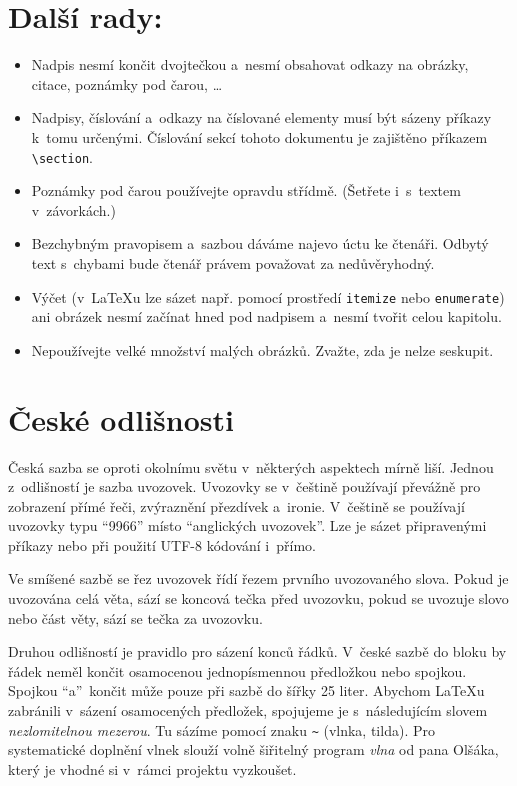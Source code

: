 \documentclass[twocolumn]{article}[23.02.2024]
\begin{document}
\section{Další rady:}
\label{sec:dalsi_rady}
\begin{itemize}
    \item Nadpis nesmí končit dvojtečkou a~nesmí obsahovat odkazy na obrázky, citace, poznámky pod čarou, \ldots
    \item Nadpisy, číslování a~odkazy na číslované elementy musí být sázeny příkazy k~tomu určenými. Číslování sekcí tohoto dokumentu je zajištěno příkazem \verb|\section|.
    \item Poznámky pod čarou\footnotemark{} používejte opravdu střídmě. (Šetřete i~s~textem v~závorkách.)
    \item Bezchybným pravopisem a~sazbou dáváme najevo úctu ke čtenáři. Odbytý text s~chybami bude čtenář právem považovat za nedůvěryhodný.
    \item Výčet (v~{\LaTeX}u lze sázet např. pomocí prostředí \texttt{itemize} nebo \texttt{enumerate}) ani obrázek nesmí začínat hned pod nadpisem a~nesmí tvořit celou kapitolu.
    \item Nepoužívejte velké množství malých obrázků. Zvažte, zda je nelze seskupit.
\end{itemize}

\section{České odlišnosti}
Česká sazba se oproti okolnímu světu v~některých aspektech mírně liší.
Jednou z~odlišností je sazba uvozovek.
Uvozovky se v~češtině používají převážně pro zobrazení přímé řeči, zvýraznění přezdívek a~ironie.
V~češtině se používají uvozovky typu \enquote{9966} místo \foreignquote{english}{anglických uvozovek}.
Lze je sázet připravenými příkazy nebo při použití UTF-8 kódování i~přímo.

Ve smíšené sazbě se řez uvozovek řídí řezem prvního uvozovaného slova.
Pokud je uvozována celá věta, sází se koncová tečka před uvozovku, pokud se uvozuje slovo nebo část věty, sází se tečka za uvozovku.

Druhou odlišností je pravidlo pro sázení konců řádků.
V~české sazbě do bloku by řádek neměl končit osamocenou jednopísmennou předložkou nebo spojkou.
Spojkou \enquote{a}~končit může pouze při sazbě do šířky 25 liter.
Abychom {\LaTeX}u zabránili v~sázení osamocených předložek, spojujeme je s~následujícím slovem \emph{nezlomitelnou mezerou}.
Tu sázíme pomocí znaku \texttt{\textasciitilde} (vlnka, tilda).
Pro systematické doplnění vlnek slouží volně šiřitelný program \emph{vlna} od pana Olšáka\footnotemark{}, který je vhodné si v~rámci projektu vyzkoušet.
\end{document}
